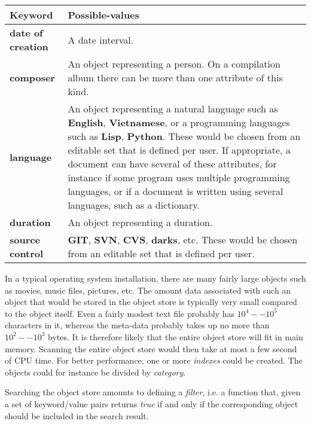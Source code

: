 \begin{tabularx}{\linewidth}%
{|>{\setlength\hsize{.2\hsize}}X|%
  >{\setlength\hsize{.8\hsize}}X|}
\hline
Keyword & Possible-values\\
\hline\hline
\textbf{date of creation} &

A date interval.\\
\hline
\textbf{composer} &

An object representing a person.  On a compilation album there
can be more than one attribute of this kind. \\
\hline
\textbf{language} &

An object representing a natural language such
as \textbf{English}, \textbf{Vietnamese}, or a programming languages
such as \textbf{Lisp}, \textbf{Python}. These would
be chosen from an editable set that is defined per user.  If
appropriate, a document can have several of these attributes, for
instance if some program uses multiple programming languages, or
if a document is written using several languages, such as a
dictionary. \\
\hline
\textbf{duration} &

An object representing a duration. \\
\hline
\textbf{source control} &
 
\textbf{GIT}, \textbf{SVN}, \textbf{CVS}, \textbf{darks}, etc.  These
would be chosen from an editable set that is defined per user.\\
\hline
\end{tabularx}

In a typical operating system installation, there are many fairly
large objects such as movies, music files, pictures, etc.  The amount
data associated with such an object that would be stored in the object
store is typically very small compared to the object itself.  Even a
fairly modest text file probably has $10^4 -- 10^5$ characters in it,
whereas the meta-data probably takes up no more than $10^2 -- 10^3$
bytes.  It is therefore likely that the entire object store will fit
in main memory.  Scanning the entire object store would then take at
most a few second of CPU time.  For better performance, one or more
\emph{indexes} could be created.  The objects could for instance be
divided by \emph{category}.

Searching the object store amounts to defining a \emph{filter},
i.e. a function that, given a set of keyword/value pairs returns
\emph{true} if and only if the corresponding object should be included
in the search result. 
